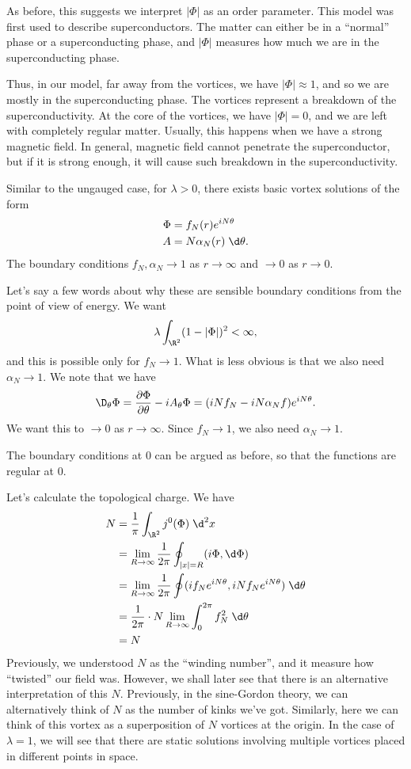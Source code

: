 \documentclass[a4paper]{article}
\begin{document}
As before, this suggests we interpret $|\Phi|$ as an order parameter. This model was first used to describe superconductors. The matter can either be in a ``normal'' phase or a superconducting phase, and $|\Phi|$ measures how much we are in the superconducting phase.

Thus, in our model, far away from the vortices, we have $|\Phi| \approx 1$, and so we are mostly in the superconducting phase. The vortices represent a breakdown of the superconductivity. At the core of the vortices, we have $|\Phi| = 0$, and we are left with completely regular matter. Usually, this happens when we have a strong magnetic field. In general, magnetic field cannot penetrate the superconductor, but if it is strong enough, it will cause such breakdown in the superconductivity.

Similar to the ungauged case, for $\lambda > 0$, there exists basic vortex solutions of the form
\begin{align*}
  \Phi &= f_N(r) e^{iN\theta}\\
  A &= N \alpha_N(r) \;\d \theta.
\end{align*}
The boundary conditions $f_N, \alpha_N \to 1$ as $r \to \infty$ and $\to 0$ as $r \to 0$.

Let's say a few words about why these are sensible boundary conditions from the point of view of energy. We want
\[
  \lambda \int_{\R^2} (1 - |\Phi|)^2 < \infty,
\]
and this is possible only for $f_N \to 1$. What is less obvious is that we also need $\alpha_N \to 1$. We note that we have
\[
  \D_\theta \Phi = \frac{\partial \Phi}{\partial \theta} - i A_\theta \Phi = (iN f_N - iN \alpha_N f) e^{iN\theta}.
\]
We want this to $\to 0$ as $r \to \infty$. Since $f_N \to 1$, we also need $\alpha_N \to 1$.

The boundary conditions at $0$ can be argued as before, so that the functions are regular at $0$.

Let's calculate the topological charge. We have
\begin{align*}
  N &= \frac{1}{\pi} \int_{\R^2} j^0(\Phi)\;\d^2 x \\
  &= \lim_{R \to \infty} \frac{1}{2\pi} \oint_{|x| = R} (i \Phi, \d \Phi) \\
  &= \lim_{R \to \infty} \frac{1}{2\pi} \oint (if_N e^{iN\theta}, iN f_N e^{iN\theta})\;\d \theta\\
  &= \frac{1}{2\pi} \cdot N \lim_{R \to \infty} \int_0^{2\pi} f_N^2 \;\d \theta\\
  &= N
\end{align*}
Previously, we understood $N$ as the ``winding number'', and it measure how ``twisted'' our field was. However, we shall later see that there is an alternative interpretation of this $N$. Previously, in the sine-Gordon theory, we can alternatively think of $N$ as the number of kinks we've got. Similarly, here we can think of this vortex as a superposition of $N$ vortices at the origin. In the case of $\lambda = 1$, we will see that there are static solutions involving multiple vortices placed in different points in space.
\end{document}
